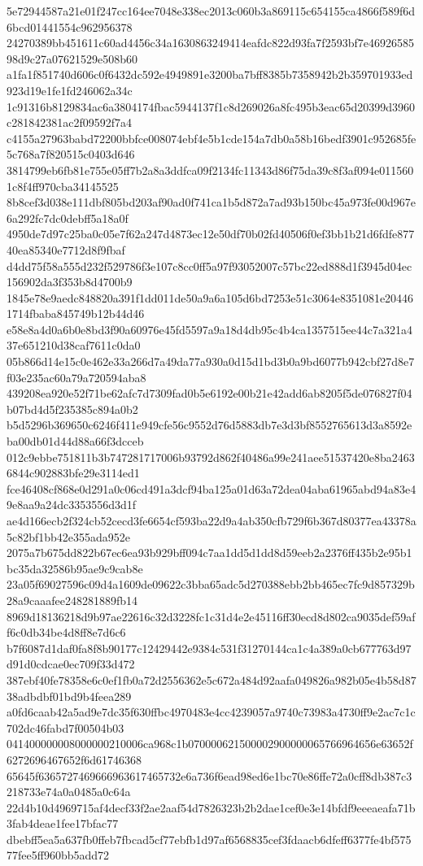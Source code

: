 {5e72944587a21e01f247cc164ee7048e338ec2013c060b3a869115c654155ca4866f589f6d6bcd01441554c962956378
24270389bb451611c60ad4456c34a1630863249414eafdc822d93fa7f2593bf7e4692658598d9c27a07621529e508b60
a1fa1f851740d606c0f6432dc592e4949891e3200ba7bff8385b7358942b2b359701933ed923d19e1fe1fd246062a34c
1c91316b8129834ac6a3804174fbac5944137f1c8d269026a8fc495b3eac65d20399d3960c281842381ac2f09592f7a4
c4155a27963babd72200bbfce008074ebf4e5b1cde154a7db0a58b16bedf3901c952685fe5c768a7f820515c0403d646
3814799eb6fb81e755e05ff7b2a8a3ddfca09f2134fc11343d86f75da39c8f3af094e0115601c8f4ff970cba34145525
8b8cef3d038e111dbf805bd203af90ad0f741ca1b5d872a7ad93b150bc45a973fe00d967e6a292fc7dc0debff5a18a0f
4950de7d97c25ba0c05e7f62a247d4873ec12e50df70b02fd40506f0ef3bb1b21d6fdfe87740ea85340e7712d8f9fbaf
d4dd75f58a555d232f529786f3e107c8cc0ff5a97f93052007c57bc22ed888d1f3945d04ec156902da3f353b8d4700b9
1845e78e9aedc848820a391f1dd011de50a9a6a105d6bd7253e51c3064e8351081e204461714fbaba845749b12b44d46
e58e8a4d0a6b0e8bd3f90a60976e45fd5597a9a18d4db95c4b4ca1357515ee44c7a321a437e651210d38caf7611c0da0
05b866d14e15c0e462e33a266d7a49da77a930a0d15d1bd3b0a9bd6077b942cbf27d8e7f03e235ac60a79a720594aba8
439208ea920e52f71be62afc7d7309fad0b5e6192e00b21e42add6ab8205f5de076827f04b07bd4d5f235385c894a0b2
b5d5296b369650c6246f411e949cfe56c9552d76d5883db7e3d3bf8552765613d3a8592eba00db01d44d88a66f3dcceb
012c9ebbe751811b3b747281717006b93792d862f40486a99e241aee51537420e8ba24636844c902883bfe29e3114ed1
fce46408cf868e0d291a0c06cd491a3dcf94ba125a01d63a72dea04aba61965abd94a83e49e8aa9a24dc3353556d3d1f
ae4d166ecb2f324cb52cecd3fe6654cf593ba22d9a4ab350cfb729f6b367d80377ea43378a5c82bf1bb42e355ada952e
2075a7b675dd822b67ec6ea93b929bff094c7aa1dd5d1dd8d59eeb2a2376ff435b2e95b1bc35da32586b95ae9c9cab8e
23a05f69027596c09d4a1609de09622c3bba65adc5d270388ebb2bb465ec7fc9d857329b28a9caaafee248281889fb14
8969d18136218d9b97ae22616c32d3228fc1c31d4e2e45116ff30ecd8d802ca9035def59aff6c0db34be4d8ff8e7d6c6
b7f6087d1daf0fa8f8b90177c12429442e9384c531f31270144ca1c4a389a0cb677763d97d91d0cdcae0ec709f33d472
387ebf40fe78358e6c0ef1fb0a72d2556362e5c672a484d92aafa049826a982b05e4b58d8738adbdbf01bd9b4feea289
a0fd6caab42a5ad9e7dc35f630ffbc4970483e4cc4239057a9740c73983a4730ff9e2ac7c1c702dc46fabd7f00504b03
041400000008000000210006ca968c1b070000621500002900000065766964656e63652f6272696467652f6d61746368
65645f6365727469666963617465732e6a736f6ead98ed6e1bc70e86ffe72a0cff8db387c3218733e74a0a0485a0c64a
22d4b10d4969715af4decf33f2ae2aaf54d7826323b2b2dae1cef0e3e14bfdf9eeeaeafa71b3fab4deae1fee17bfac77
dbebff5ea5a637fb0ffeb7fbcad5cf77ebfb1d97af6568835cef3fdaacb6dfeff6377fe4bf57577fee5ff960bb5add72
}
